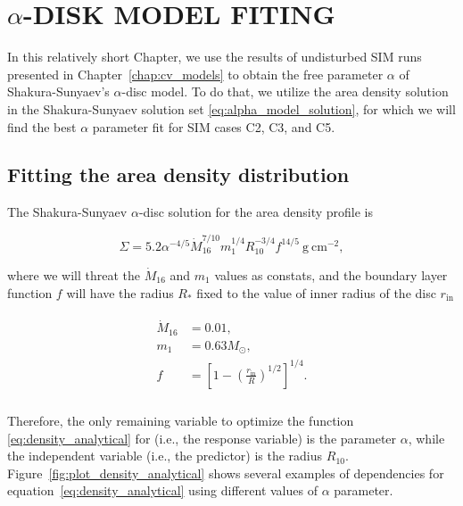 \chapter{$\alpha$-DISK MODEL FITING}
\thispagestyle{empty}

In this relatively short Chapter, we use the results of undisturbed SIM runs presented in Chapter~\ref{chap:cv_models} to obtain the free parameter $\alpha$ of Shakura-Sunyaev's $\alpha$-disc model. To do that, we utilize the area density solution in the Shakura-Sunyaev solution set \eqref{eq:alpha_model_solution}, for which we will find the best $\alpha$ parameter fit for SIM cases C2, C3, and C5.

\section{Fitting the area density distribution}
    The Shakura-Sunyaev $\alpha$-disc solution for the area density profile is

    \begin{equation}
        \Sigma = 5.2 \alpha^{-4/5} \dot{M}^{7/10}_{16} m^{1/4}_1 R^{-3/4}_{10} f^{14/5}\ \si{\gram\ \cm^{-2}},
        \label{eq:density_analytical}
    \end{equation}

    where we will threat the $\dot{M}_{16}$ and $m_1$ values as constats, and the boundary layer function $f$ will have the radius $R_*$ fixed to the value of inner radius of the disc $r_{\mathrm{in}}$

    \begin{align}
        \begin{split}
            \dot{M}_{16} &= 0.01, \\
            m_1 &= 0.63 M_{\odot}, \\
            f &= \left[ 1 - \left( \frac{r_{\mathrm{in}}}{R} \right)^{1/2} \right]^{1/4}. \\
        \end{split}
    \end{align}

    Therefore, the only remaining variable to optimize the function \eqref{eq:density_analytical} for (i.e., the response variable) is the parameter $\alpha$, while the independent variable (i.e., the predictor) is the radius $R_{10}$. Figure~\ref{fig:plot_density_analytical} shows several examples of dependencies for equation~\eqref{eq:density_analytical} using different values of $\alpha$ parameter.  
    
